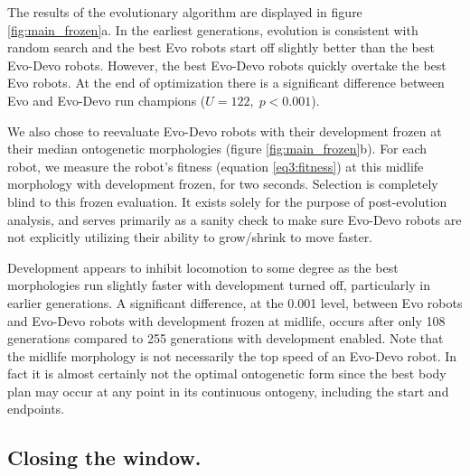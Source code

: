 The results of the evolutionary algorithm are displayed in figure \ref{fig:main_frozen}a. 
In the earliest generations, evolution is consistent with random search and the best Evo robots start off slightly better than the best Evo-Devo robots.
However, the best Evo-Devo robots quickly overtake the best Evo robots. 
At the end of optimization there is a significant difference between Evo and Evo-Devo run champions ($U=122, \; p<0.001$).



We also chose to reevaluate Evo-Devo robots with their development frozen at their median ontogenetic morphologies (figure \ref{fig:main_frozen}b). For each robot, we measure the robot's fitness (equation \ref{eq3:fitness}) at this midlife morphology with development frozen, for two seconds. Selection is completely blind to this frozen evaluation. It exists solely for the purpose of post-evolution analysis, and serves primarily as a sanity check to make sure Evo-Devo robots are not explicitly utilizing their ability to grow/shrink to move faster.

Development appears to inhibit locomotion to some degree as the best morphologies run slightly faster with development turned off, particularly in earlier generations.
A significant difference, at the 0.001 level, between Evo robots and Evo-Devo robots with development frozen at midlife, occurs after only 108 generations compared to 255 generations with development enabled.
Note that the midlife morphology is not necessarily the top speed of an Evo-Devo robot. In fact it is almost certainly not the optimal ontogenetic form since the best body plan may occur at any point in its continuous ontogeny, including the start and endpoints.




\subsection*{Closing the window.}

